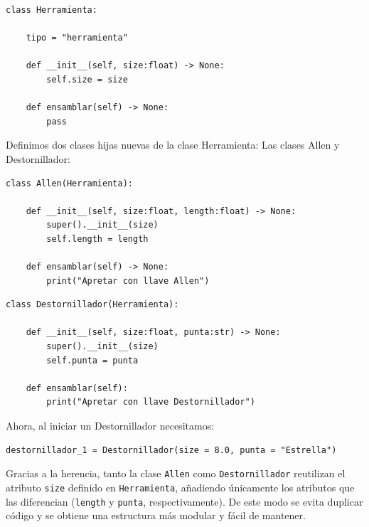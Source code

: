 \documentclass[11pt,a5paper,twoside]{book}
\begin{document}
\newpage


\begin{tcolorbox}
\scriptsize
 \begin{verbatim}
class Herramienta:

    tipo = "herramienta"
    
    def __init__(self, size:float) -> None:
        self.size = size

    def ensamblar(self) -> None:
        pass
\end{verbatim}
\end{tcolorbox}
Definimos dos clases hijas nuevas de la clase Herramienta: Las clases Allen y Destornillador:


\begin{tcolorbox}
\scriptsize
 \begin{verbatim}
class Allen(Herramienta):

    def __init__(self, size:float, length:float) -> None:
        super().__init__(size)
        self.length = length

    def ensamblar(self) -> None:
        print("Apretar con llave Allen")
\end{verbatim}
\end{tcolorbox}


\begin{tcolorbox}
\scriptsize
 \begin{verbatim}
class Destornillador(Herramienta):

    def __init__(self, size:float, punta:str) -> None:
        super().__init__(size)
        self.punta = punta

    def ensamblar(self):
        print("Apretar con llave Destornillador")
\end{verbatim}
\end{tcolorbox}
Ahora, al iniciar un Destornillador necesitamos:


\begin{tcolorbox}
\scriptsize
 \begin{verbatim}
destornillador_1 = Destornillador(size = 8.0, punta = "Estrella")
\end{verbatim}
\end{tcolorbox}
Gracias a la herencia, tanto la clase {\scriptsize \texttt{Allen}} como {\scriptsize \texttt{Destornillador}} reutilizan el atributo {\scriptsize \texttt{size}} definido en {\scriptsize \texttt{Herramienta}}, añadiendo únicamente los atributos que las diferencian ({\scriptsize \texttt{length}} y {\scriptsize \texttt{punta}}, respectivamente). De este modo se evita duplicar código y se obtiene una estructura más modular y fácil de mantener.
\end{document}
